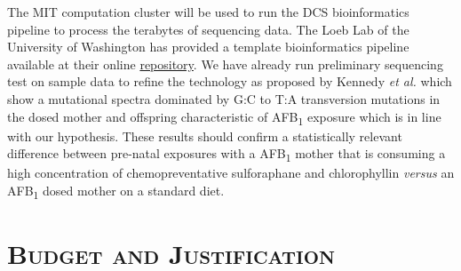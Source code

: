 \documentclass[12pt]{article}
\let\cite\shortcite %
\begin{document}
\vspace{4mm}
The MIT computation cluster will be used to run the DCS bioinformatics pipeline to process the terabytes of sequencing data.
The Loeb Lab of the University of Washington has provided a template bioinformatics pipeline available at their online \href{https://github.com/loeblab}{repository}.
We have already run preliminary sequencing test on sample data to refine the technology as proposed by Kennedy \emph{et al.} which show a mutational spectra dominated by G:C to T:A transversion mutations in the dosed mother and offspring characteristic of AFB\textsubscript{1} exposure \cite{Kennedy2014} which is in line with our hypothesis.
These results should confirm a statistically relevant difference between pre-natal exposures with a AFB\textsubscript{1} mother that is consuming a high concentration of chemopreventative sulforaphane and chlorophyllin \emph{versus} an AFB\textsubscript{1} dosed mother on a standard diet.


\newpage

\section*{\upshape\textsc{Budget and Justification}}
\end{document}
